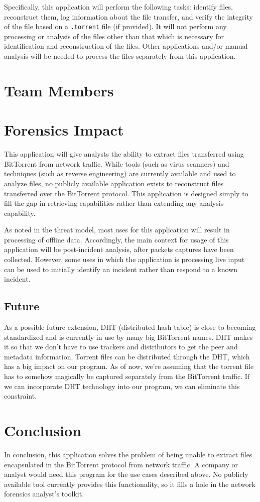 \documentclass{acm_proc_article-sp}
\begin{document}
Specifically, this application will perform the following tasks: identify files,
reconstruct them, log information about the file transfer, and verify the
integrity of the file based on a \texttt{.torrent} file (if provided). It will not
perform any processing or analysis of the files other than that which is
necessary for identification and reconstruction of the files. Other applications
and/or manual analysis will be needed to process the files separately from this
application.


\section{Team Members}



\section{Forensics Impact}
This application will give analysts the ability to extract files transferred
using BitTorrent from network traffic. While tools (such as virus scanners) and
techniques (such as reverse engineering) are currently available and used to
analyze files, no publicly available application exists to reconstruct files
transferred over the BitTorrent protocol. This application is designed simply to
fill the gap in retrieving capabilities rather than extending any analysis
capability.

As noted in the threat model, most uses for this application will result in
processing of offline data. Accordingly, the main context for usage of this
application will be post-incident analysis, after packets captures have been
collected. However, some uses in which the application is processing live input
can be used to initially identify an incident rather than respond to a known
incident.

\subsection{Future}
As a possible future extension, DHT (distributed hash table) is close
to becoming standardized and is currently in use by many big BitTorrent names.
DHT makes it so that we don't have to use trackers and distributors to get the
peer and metadata information.  Torrent files can be distributed through the
DHT, which has a big impact on our program.  As of now, we're assuming that the
torrent file has to somehow magically be captured separately from the BitTorrent
traffic.  If we can incorporate DHT technology into our program, we can
eliminate this constraint.

\section{Conclusion}
In conclusion, this application solves the problem of being unable to extract
files encapsulated in the BitTorrent protocol from network traffic.  A company
or analyst would need this program for the use cases described above.  No
publicly available tool currently provides this functionality, so it fills a
hole in the network forensics analyst's toolkit.

%
%
\end{document}
